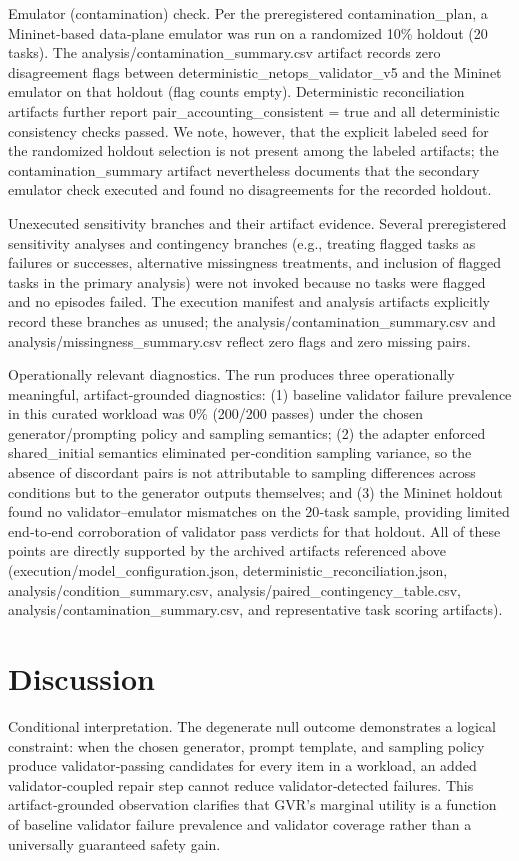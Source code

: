 \documentclass[conference]{IEEEtran}
\begin{document}
Emulator (contamination) check. Per the preregistered contamination\_plan, a Mininet‑based data‑plane emulator was run on a randomized 10\% holdout (20 tasks). The analysis/contamination\_summary.csv artifact records zero disagreement flags between deterministic\_netops\_validator\_v5 and the Mininet emulator on that holdout (flag counts empty). Deterministic reconciliation artifacts further report pair\_accounting\_consistent = true and all deterministic consistency checks passed. We note, however, that the explicit labeled seed for the randomized holdout selection is not present among the labeled artifacts; the contamination\_summary artifact nevertheless documents that the secondary emulator check executed and found no disagreements for the recorded holdout.

Unexecuted sensitivity branches and their artifact evidence. Several preregistered sensitivity analyses and contingency branches (e.g., treating flagged tasks as failures or successes, alternative missingness treatments, and inclusion of flagged tasks in the primary analysis) were not invoked because no tasks were flagged and no episodes failed. The execution manifest and analysis artifacts explicitly record these branches as unused; the analysis/contamination\_summary.csv and analysis/missingness\_summary.csv reflect zero flags and zero missing pairs.

Operationally relevant diagnostics. The run produces three operationally meaningful, artifact‑grounded diagnostics: (1) baseline validator failure prevalence in this curated workload was 0\% (200/200 passes) under the chosen generator/prompting policy and sampling semantics; (2) the adapter enforced shared\_initial semantics eliminated per‑condition sampling variance, so the absence of discordant pairs is not attributable to sampling differences across conditions but to the generator outputs themselves; and (3) the Mininet holdout found no validator--emulator mismatches on the 20‑task sample, providing limited end‑to‑end corroboration of validator pass verdicts for that holdout. All of these points are directly supported by the archived artifacts referenced above (execution/model\_configuration.json, deterministic\_reconciliation.json, analysis/condition\_summary.csv, analysis/paired\_contingency\_table.csv, analysis/contamination\_summary.csv, and representative task scoring artifacts).

\section{Discussion}
Conditional interpretation. The degenerate null outcome demonstrates a logical constraint: when the chosen generator, prompt template, and sampling policy produce validator‑passing candidates for every item in a workload, an added validator‑coupled repair step cannot reduce validator‑detected failures. This artifact‑grounded observation clarifies that GVR's marginal utility is a function of baseline validator failure prevalence and validator coverage rather than a universally guaranteed safety gain.
\end{document}
